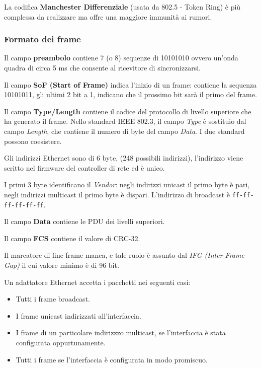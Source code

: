             La codifica \textbf{Manchester Differenziale} (usata da 802.5 - Token Ring) è più complessa da realizzare ma offre una maggiore immunità ai rumori.

        \subsubsection{Formato dei frame}
            

            Il campo \textbf{preambolo} contiene 7 (o 8) sequenze di 10101010 ovvero un'onda quadra di circa 5 ms che consente al ricevitore di sincronizzarsi.

            Il campo \textbf{SoF (Start of Frame)} indica l'inizio di un frame: contiene la sequenza 10101011, gli ultimi 2 bit a 1, indicano che il prossimo bit sarà il primo del frame.

            Il campo \textbf{Type/Length} contiene il codice del protocollo di livello superiore che ha generato il frame. Nello standard IEEE 802.3, il campo \textit{Type} è sostituio dal campo \textit{Length}, che contiene il numero di byte del campo \textit{Data}. I due standard possono coesistere.

            Gli indirizzi Ethernet sono di 6 byte, (248 possibili indirizzi), l'indirizzo viene scritto nel firmware del controller di rete ed è unico.

            I primi 3 byte identificano il \textit{Vendor}: negli indirizzi unicast il primo byte è pari, negli indirizzi multicast il primo byte è dispari. L'indirizzo di broadcast è \texttt{ff-ff-ff-ff-ff-ff}.

            Il campo \textbf{Data} contiene le PDU dei livelli superiori.

            Il campo \textbf{FCS} contiene il valore di CRC-32.

            Il marcatore di fine frame manca, e tale ruolo è assunto dal \textit{IFG (Inter Frame Gap)} il cui valore minimo è di 96 bit.

            Un adattatore Ethernet accetta i pacchetti nei seguenti casi:
            \begin{itemize}
                \item Tutti i frame broadcast.
                \item I frame unicast indirizzati all'interfaccia.
                \item I frame di un particolare indirizzzo multicast, se l'interfaccia è stata configurata oppurtunamente.
                \item Tutti i frame se l'interfaccia è configurata in modo promiscuo.
            \end{itemize}

